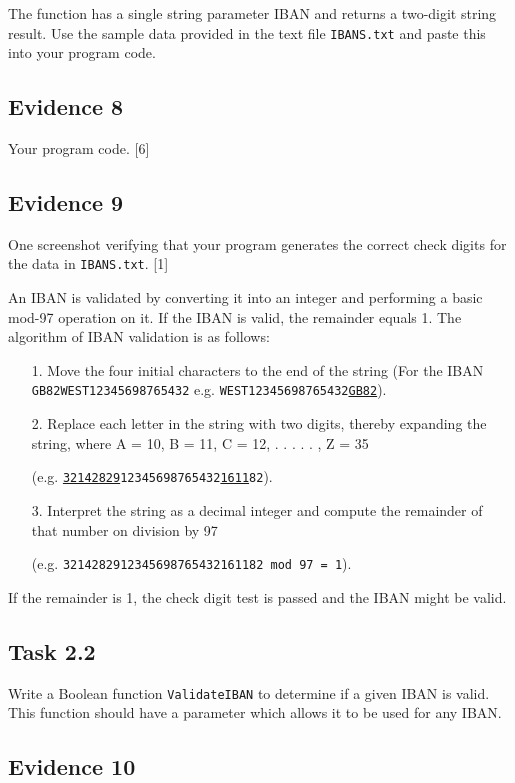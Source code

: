 The function has a single string parameter IBAN and returns a two-digit
string result. Use the sample data provided in the text file \texttt{IBANS.txt}
and paste this into your program code.

\subsection*{Evidence 8 }

Your program code. \hfill{}{[}6{]}

\subsection*{Evidence 9 }

One screenshot verifying that your program generates the correct check
digits for the data in \texttt{IBANS.txt}. \hfill{}{[}1{]}

An IBAN is validated by converting it into an integer and performing
a basic mod-97 operation on it. If the IBAN is valid, the remainder
equals 1. The algorithm of IBAN validation is as follows:
\begin{enumerate}
\item[1.]  Move the four initial characters to the end of the string (For the
IBAN \texttt{GB82WEST12345698765432} e.g. \texttt{WEST12345698765432}\texttt{\uline{GB82}}).
\item[2.]  Replace each letter in the string with two digits, thereby expanding
the string, where A = 10, B = 11, C = 12, . . . . . , Z = 35 

(e.g. \texttt{\uline{32142829}}\texttt{12345698765432}\texttt{\uline{1611}}\texttt{82}). 
\item[3.]  Interpret the string as a decimal integer and compute the remainder
of that number on division by 97 

(e.g. \texttt{3214282912345698765432161182 mod 97 = 1}). 
\end{enumerate}
If the remainder is 1, the check digit test is passed and the IBAN
might be valid.

\subsection*{Task 2.2 }

Write a Boolean function \texttt{ValidateIBAN} to determine if a given
IBAN is valid. This function should have a parameter which allows
it to be used for any IBAN. 

\subsection*{Evidence 10 }

